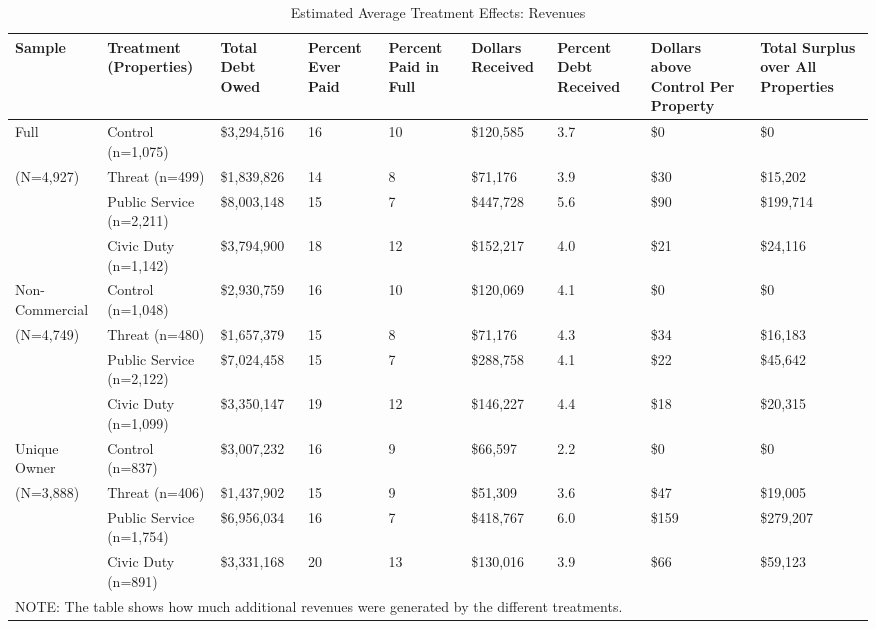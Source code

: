 \documentclass[12pt,titlepage]{article}
\begin{document}
\begin{sidewaystable}[htbp]
\centering
\caption{Estimated Average Treatment Effects: Revenues} 
\label{table:summary}
\begin{tabular}{|p{2.2cm}|p{1.4cm}|p{1.8cm}|p{1.2cm}|p{1.2cm}|p{1.4cm}|p{1.4cm}|p{2.2cm}|p{1.8cm}|}
  \hline
Sample & Treatment (Properties) & Total Debt Owed & Percent Ever Paid & Percent Paid in Full & Dollars Received & Percent Debt Received & Dollars above Control Per Property & Total Surplus over All Properties \\ 
  \hline
Full & Control (n=1,075) & \$3,294,516 & 16 & 10 & \$120,585 & 3.7 & \$0 & \$0 \\ 
  (N=4,927) & Threat (n=499) & \$1,839,826 & 14 & 8 & \$71,176 & 3.9 & \$30 & \$15,202 \\ 
   & Public Service (n=2,211) & \$8,003,148 & 15 & 7 & \$447,728 & 5.6 & \$90 & \$199,714 \\ 
   & Civic Duty (n=1,142) & \$3,794,900 & 18 & 12 & \$152,217 & 4.0 & \$21 & \$24,116 \\ 
   \hline
Non-Commercial & Control (n=1,048) & \$2,930,759 & 16 & 10 & \$120,069 & 4.1 & \$0 & \$0 \\ 
  (N=4,749) & Threat (n=480) & \$1,657,379 & 15 & 8 & \$71,176 & 4.3 & \$34 & \$16,183 \\ 
   & Public Service (n=2,122) & \$7,024,458 & 15 & 7 & \$288,758 & 4.1 & \$22 & \$45,642 \\ 
   & Civic Duty (n=1,099) & \$3,350,147 & 19 & 12 & \$146,227 & 4.4 & \$18 & \$20,315 \\ 
   \hline
Unique Owner & Control (n=837) & \$3,007,232 & 16 & 9 & \$66,597 & 2.2 & \$0 & \$0 \\ 
  (N=3,888) & Threat (n=406) & \$1,437,902 & 15 & 9 & \$51,309 & 3.6 & \$47 & \$19,005 \\ 
   & Public Service (n=1,754) & \$6,956,034 & 16 & 7 & \$418,767 & 6.0 & \$159 & \$279,207 \\ 
   & Civic Duty (n=891) & \$3,331,168 & 20 & 13 & \$130,016 & 3.9 & \$66 & \$59,123 \\ 
   \hline
\multicolumn{9}{l}{NOTE: The table shows how much additional revenues were generated by the different treatments.} \\
\end{tabular}
\end{sidewaystable}
\end{document}

